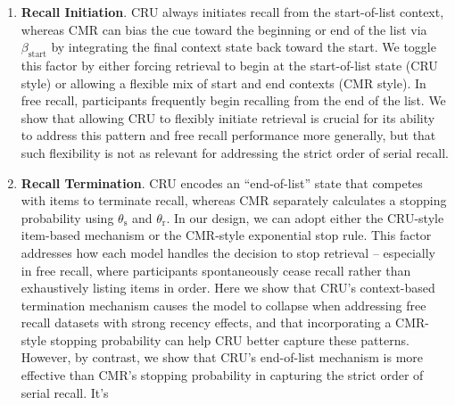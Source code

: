 \documentclass[
  letterpaper,
  11pt,
  english,
  singlespacing,
  headsepline]{MastersDoctoralThesis}
\begin{document}
\begin{enumerate}
  learning rate by serial position in context-to-feature memory
  \(M^{CF}\) from an initial peak to a final baseline. We don't evaluate
  item confusability in free recall (\(g \rightarrow \infty\)), so for
  free recall evaluation we focus on assessing the effectiveness of
  CMR-style primacy gradient in CRU. We show that incorporating CMR's
  primacy gradient can enhance CRU's ability to capture the primacy
  effect in free recall without supposing that items can be visually
  confused with one another during encoding. In our serial recall
  evaluation, we have the item confusability mechanism and variable
  contextual integration rate activated across variants, and observe
  that incrementally adding CMR's primacy gradient has limited impact on
  performance.
\item
  \textbf{Recall Initiation}. CRU always initiates recall from the
  start-of-list context, whereas CMR can bias the cue toward the
  beginning or end of the list via \(\beta_\text{start}\) by integrating
  the final context state back toward the start. We toggle this factor
  by either forcing retrieval to begin at the start-of-list state (CRU
  style) or allowing a flexible mix of start and end contexts (CMR
  style). In free recall, participants frequently begin recalling from
  the end of the list. We show that allowing CRU to flexibly initiate
  retrieval is crucial for its ability to address this pattern and free
  recall performance more generally, but that such flexibility is not as
  relevant for addressing the strict order of serial recall.
\item
  \textbf{Recall Termination}. CRU encodes an ``end-of-list'' state that
  competes with items to terminate recall, whereas CMR separately
  calculates a stopping probability using \(\theta_\text{s}\) and
  \(\theta_\text{r}\). In our design, we can adopt either the CRU-style
  item-based mechanism or the CMR-style exponential stop rule. This
  factor addresses how each model handles the decision to stop retrieval
  -- especially in free recall, where participants spontaneously cease
  recall rather than exhaustively listing items in order. Here we show
  that CRU's context-based termination mechanism causes the model to
  collapse when addressing free recall datasets with strong recency
  effects, and that incorporating a CMR-style stopping probability can
  help CRU better capture these patterns. However, by contrast, we show
  that CRU's end-of-list mechanism is more effective than CMR's stopping
  probability in capturing the strict order of serial recall. It's

\end{enumerate}
\end{document}
